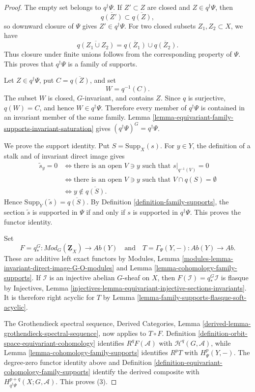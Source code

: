 \begin{proof}
The empty set belongs to $q^\dagger\Psi$. If $Z'\subset Z$ are closed and
$Z\in q^\dagger\Psi$, then
$$
\overline{q(Z')}\subset\overline{q(Z)},
$$
so downward closure of $\Psi$ gives $Z'\in q^\dagger\Psi$. For two closed
subsets $Z_1,Z_2\subset X$, we have
$$
\overline{q(Z_1\cup Z_2)}
=
\overline{q(Z_1)}\cup\overline{q(Z_2)}.
$$
Thus closure under finite unions follows from the corresponding property
of $\Psi$. This proves that $q^\dagger\Psi$ is a family of supports.

Let $Z\in q^\dagger\Psi$, put $C=\overline{q(Z)}$, and set
$$
W=q^{-1}(C).
$$
The subset $W$ is closed, $G$-invariant, and contains $Z$. Since $q$ is
surjective, $q(W)=C$, and hence $W\in q^\dagger\Psi$. Therefore every
member of $q^\dagger\Psi$ is contained in an invariant member of the same
family. Lemma
\ref{lemma-equivariant-family-supports-invariant-saturation} gives
$(q^\dagger\Psi)^G=q^\dagger\Psi$.

We prove the support identity. Put $S=\text{Supp}_X(s)$. For $y\in Y$, the
definition of a stalk and of invariant direct image gives
\begin{align*}
\widetilde s_y=0
&\Longleftrightarrow
\text{there is an open }V\ni y\text{ such that }
s|_{q^{-1}(V)}=0\\
&\Longleftrightarrow
\text{there is an open }V\ni y\text{ such that }
V\cap q(S)=\emptyset\\
&\Longleftrightarrow
y\notin\overline{q(S)}.
\end{align*}
Hence $\text{Supp}_Y(\widetilde s)=\overline{q(S)}$. By Definition
\ref{definition-family-supports}, the section $\widetilde s$ is supported
in $\Psi$ if and only if $s$ is supported in $q^\dagger\Psi$. This proves
the functor identity.

Set
$$
F=q_*^G:
\textit{Mod}_G(\underline{\mathbf Z}_X)
\longrightarrow\textit{Ab}(Y)
\quad\text{and}\quad
T=\Gamma_\Psi(Y,-):\textit{Ab}(Y)\longrightarrow\textit{Ab}.
$$
These are additive left exact functors by Modules, Lemma
\ref{modules-lemma-invariant-direct-image-G-O-modules} and Lemma
\ref{lemma-cohomology-family-supports}. If $\mathcal I$ is an injective
abelian $G$-sheaf on $X$, then $F(\mathcal I)=q_*^G\mathcal I$ is flasque
by Injectives, Lemma
\ref{injectives-lemma-equivariant-injective-sections-invariants}. It is
therefore right acyclic for $T$ by Lemma
\ref{lemma-family-supports-flasque-soft-acyclic}.

The Grothendieck spectral sequence, Derived Categories, Lemma
\ref{derived-lemma-grothendieck-spectral-sequence}, now applies to
$T\circ F$. Definition
\ref{definition-orbit-space-equivariant-cohomology} identifies
$R^qF(\mathcal A)$ with $\mathcal H^q(G,\mathcal A)$, while Lemma
\ref{lemma-cohomology-family-supports} identifies $R^pT$ with
$H^p_\Psi(Y,-)$. The degree-zero functor identity above and Definition
\ref{definition-equivariant-cohomology-family-supports} identify the
derived composite with
$H^{p+q}_{q^\dagger\Psi}(X;G,\mathcal A)$. This proves (3).
\end{proof}


